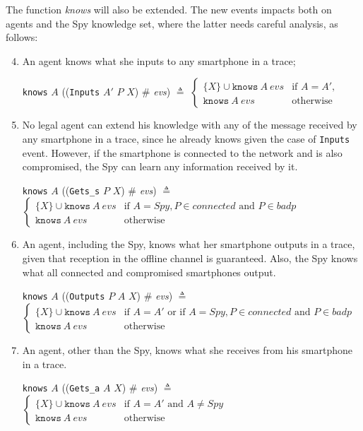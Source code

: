 The function \textit{knows} will also be extended. The new events impacts both on agents and the Spy knowledge set, where the latter needs careful analysis, as follows:
\begin{enumerate}
  \setcounter{enumi}{3}
  \item An agent knows what she inputs to any smartphone in a trace;
  \begin{center}
    \texttt{knows} $A$ ((\texttt{Inputs} $A'$ $P$ $X$) $\#$ \textit{evs}) $\triangleq$ $\begin{cases}
      \{ X\} \cup \texttt{knows}\ A\ evs & \text{if } A = A', \\
      \texttt{knows}\ A\ evs & \text{otherwise}
    \end{cases}$
  \end{center}

  \item No legal agent can extend his knowledge with any of the message received by any smartphone in a trace, since he already knows given the case of \texttt{Inputs} event. However, if the smartphone is connected to the network and is also compromised, the Spy can learn any information received by it.
  \begin{center}
    \texttt{knows} $A$ ((\texttt{Gets\_s} $P$ $X$) $\#$ \textit{evs}) $\triangleq$ $\begin{cases}
      \{ X\} \cup \texttt{knows}\ A\ evs & \text{if } A = Spy, P \in \textit{connected} \text{ and } P \in badp\\
      \texttt{knows}\ A\ evs & \text{otherwise}
    \end{cases}$
  \end{center}

  \item An agent, including the Spy, knows what her smartphone outputs in a trace, given that reception in the offline channel is guaranteed. Also, the Spy knows what all connected and compromised smartphones output.
  \begin{center}
    \texttt{knows} $A$ ((\texttt{Outputs} $P$ $A$ $X$) $\#$ \textit{evs}) $\triangleq$ $\begin{cases}
      \{ X\} \cup \texttt{knows}\ A\ evs & \text{if } A = A' \text{ or if } A = Spy, P \in \textit{connected} \text{ and } P \in badp \\
      \texttt{knows}\ A\ evs & \text{otherwise}
    \end{cases}$
  \end{center}

  \item An agent, other than the Spy, knows what she receives from his smartphone in a trace.
  \begin{center}
    \texttt{knows} $A$ ((\texttt{Gets\_a} $A$ $X$) $\#$ \textit{evs}) $\triangleq$ $\begin{cases}
      \{ X\} \cup \texttt{knows}\ A\ evs & \text{if } A = A' \text{ and } A \neq Spy \\
      \texttt{knows}\ A\ evs & \text{otherwise}
    \end{cases}$
  \end{center}
\end{enumerate}



